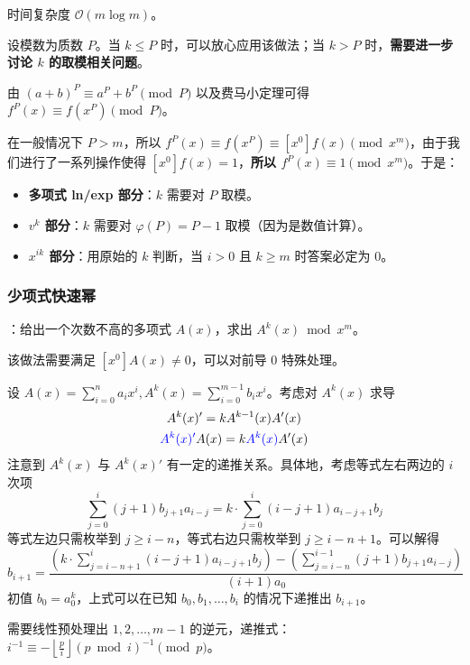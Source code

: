 时间复杂度 $\mathcal{O}(m \log m)$。

\begin{quoteblock}
设模数为质数 $P$。当 $k \leq P$ 时，可以放心应用该做法；当 $k > P$ 时，\textbf{需要进一步讨论 $k$ 的取模相关问题}。

由 $(a + b)^P \equiv a^P + b^P \pmod P$ 以及费马小定理可得 $f^P(x) \equiv f(x^P) \pmod P$。

在一般情况下 $P > m$，所以 $f^P(x) \equiv f(x^P) \equiv [x^0]f(x) \pmod{x^m}$，由于我们进行了一系列操作使得 $[x^0]f(x) = 1$，\textbf{所以 $f^P(x) \equiv 1 \pmod{x^m}$}。于是：
\begin{itemize}
    \item \textbf{多项式 ln/exp 部分}：$k$ 需要对 $P$ 取模。
    \item \textbf{$v^k$ 部分}：$k$ 需要对 $\varphi(P) = P - 1$ 取模（因为是数值计算）。
    \item \textbf{$x^{ik}$ 部分}：用原始的 $k$ 判断，当 $i > 0$ 且 $k \geq m$ 时答案必定为 $0$。
\end{itemize}
\end{quoteblock}

\subsubsection{少项式快速幂}

：给出一个次数不高的多项式 $A(x)$，求出 $A^k(x) \bmod x^m$。

该做法需要满足 $[x^0]A(x) \neq 0$，可以对前导 $0$ 特殊处理。

设 $A(x) = \sum_{i = 0}^n a_ix^i, A^k(x) = \sum_{i = 0}^{m - 1}b_ix^i$。考虑对 $A^k(x)$ 求导
\[
\begin{gathered}
A^k(x)' = kA^{k - 1}(x)A'(x) \\
{\color{blue}A^k(x)'}A(x) = k{\color{blue}A^{k}(x)}A'(x)
\end{gathered}
\]
注意到 $A^k(x)$ 与 $A^k(x)'$ 有一定的递推关系。具体地，考虑等式左右两边的 $i$ 次项
\[
\sum\limits_{j = 0}^i (j + 1)b_{j + 1}a_{i - j} = k\cdot \sum_{j = 0}^i(i - j + 1)a_{i - j + 1}b_j
\]
等式左边只需枚举到 $j \geq i - n$，等式右边只需枚举到 $j \geq i - n + 1$。可以解得
\[
b_{i + 1} = \frac{\left( k\cdot \sum\limits_{j = i - n + 1}^{i} (i - j + 1)a_{i - j + 1}b_j \right) - \left( \sum\limits_{j = i - n}^{i - 1}(j + 1)b_{j + 1}a_{i - j} \right)}{(i + 1)a_0}
\]
初值 $b_0 = a_0^k$，上式可以在已知 $b_0, b_1, \dots, b_i$ 的情况下递推出 $b_{i + 1}$。

需要线性预处理出 $1, 2, \dots, m - 1$ 的逆元，递推式：$i^{-1} \equiv -\left\lfloor \frac{p}{i} \right\rfloor (p \bmod i)^{-1} \pmod{p}$。

